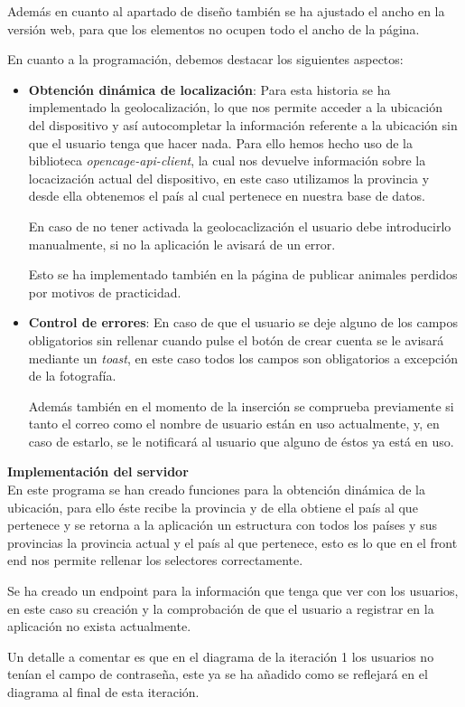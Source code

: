 Además en cuanto al apartado de diseño también se ha ajustado el ancho en la versión web, para que los elementos no ocupen todo el ancho de la página.

En cuanto a la programación, debemos destacar los siguientes aspectos:

\begin{itemize}
	\item \textbf{Obtención dinámica de localización}: Para esta historia se ha implementado la geolocalización, lo que nos permite acceder a la ubicación del dispositivo y así autocompletar la información referente a la ubicación sin que el usuario tenga que hacer nada. Para ello hemos hecho uso de la biblioteca \textit{opencage-api-client}, la cual nos devuelve información sobre la locacización actual del dispositivo, en este caso utilizamos la provincia y desde ella obtenemos el país al cual pertenece en nuestra base de datos. 
	
	En caso de no tener activada la geolocaclización el usuario debe introducirlo manualmente, si no la aplicación le avisará de un error.
	
	Esto se ha implementado también en la página de publicar animales perdidos por motivos de practicidad.
	

	\item \textbf{Control de errores}: En caso de que el usuario se deje alguno de los campos obligatorios sin rellenar cuando pulse el botón de crear cuenta se le avisará mediante un \textit{toast}, en este caso todos los campos son obligatorios a excepción de la fotografía.
	
	Además también en el momento de la inserción se comprueba previamente si tanto el correo como el nombre de usuario están en uso actualmente, y, en caso de estarlo, se le notificará al usuario que alguno de éstos ya está en uso.
\end{itemize}


\textbf{Implementación del servidor}\\

En este programa se han creado funciones para la obtención dinámica de la ubicación, para ello éste recibe la provincia y de ella obtiene el país al que pertenece y se retorna a la aplicación un estructura con todos los países y sus provincias la provincia actual y el país al que pertenece, esto es lo que en el front end nos permite rellenar los selectores correctamente.

Se ha creado un endpoint para la información que tenga que ver con los usuarios, en este caso su creación y la comprobación de que el usuario a registrar en la aplicación no exista actualmente.

Un detalle a comentar es que en el diagrama de la iteración 1 los usuarios no tenían el campo de contraseña, este ya se ha añadido como se reflejará en el diagrama al final de esta iteración.


















